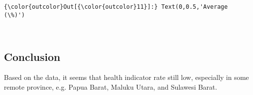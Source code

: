 \documentclass[11pt]{article}
\begin{document}
\begin{Verbatim}[commandchars=\\\{\}]
{\color{outcolor}Out[{\color{outcolor}11}]:} Text(0,0.5,'Average (\%)')
\end{Verbatim}
            
    \begin{center}
    \end{center}
    { \hspace*{\fill} \\}
    
    \subsection{Conclusion}\label{conclusion}

Based on the data, it seems that health indicator rate still low,
especially in some remote province, e.g. Papua Barat, Maluku Utara, and
Sulawesi Barat.


    
    
    
    
\end{document}
